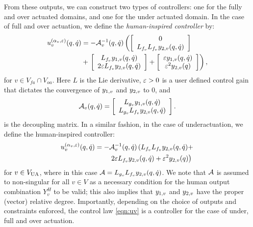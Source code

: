 From these outputs, we can construct two types of controllers: one for the fully and over actuated domains, and one for the under actuated domain.  In the case of full and over actuation, we define the {\it human-inspired controller} by:
\begin{align}
\label{eqn:uv}
 u^{(\alpha_{v},\varepsilon)}_v(q,\dot {q})& = -\mathcal{A}_v^{-1}(q,\dot {q})  \left( \left[ \begin{array}{c} 0 \\ L_{f_v}L_{f_v}y_{2,v}(q, \dot {q}) \end{array} \right]\right.  \\ &+ \left.\left[ \begin{array}{c} L_{f_v}y_{1,v}(q, \dot {q}) \\ 2 \varepsilon L_{f_v}y_{2,v}(q, \dot {q}) \end{array} \right] + \left[ \begin{array}{c} \varepsilon y_{1,v}(q,\dot {q}) \\ \varepsilon^2 y_{2,v}(q) \end{array} \right] \right),
 \nonumber
\end{align}
for $v \in V_{fa} \cap V_{oa}$.  Here $L$ is the Lie derivative, $\varepsilon > 0$ is a user defined control gain that dictates the convergence of $y_{1,v}$ and $y_{2,v}$ to 0, and
\begin{align}
 \mathcal{A}_v(q,\dot {q}) = \left[ \begin{array}{c} L_{g_v}y_{1,v}(q, \dot {q}) \\ L_{g_v}L_{f_v}y_{2,v}(q, \dot {q}) \end{array} \right].
\end{align}
is the decoupling matrix.  In a similar fashion, in the case of underactuation, we define the human-inspired controller:  
\begin{align}
\label{eqn:uvunder}
 u^{(\alpha_{v},\varepsilon)}_v(q,\dot {q}) = -&\mathcal{A}_v^{-1}(q,\dot {q}) \left( L_{f_v}L_{f_v}y_{2,v}(q,\dot {q}) + \right. \\
 & \left. 2 \varepsilon L_{f_v}y_{2,v}(q,\dot {q}) + \varepsilon^2 y_{2,v}(q)\right) \nonumber
\end{align}
for $v \in V_{\mathrm{UA}}$, where in this case $\mathcal{A} =  L_{g_v}L_{f_v}y_{2,v}(q, \dot {q})$.  We note that $\mathcal{A}$ is assumed to non-singular for all $v \in V$ as a necessary condition for the human output combination $Y^H_v$ to be valid; this also implies that $y_{1,v}$ and $y_{2,v}$ have the proper (vector) relative degree.   Importantly, depending on the choice of outputs and constraints enforced, the control law \eqref{eqn:uv} is a controller for the case of under, full and over actuation.


